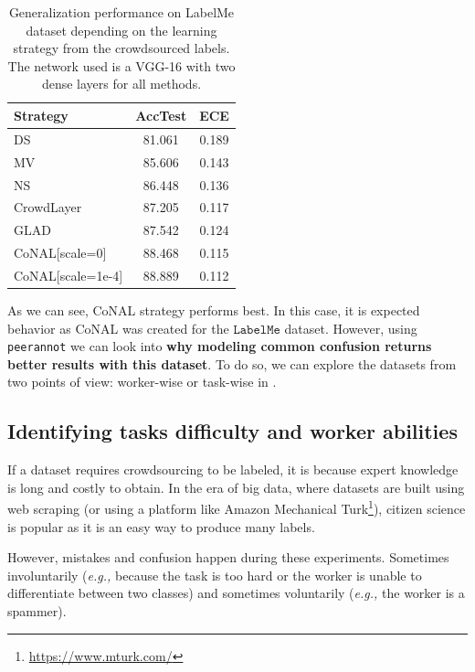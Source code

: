 \begin{table}[tbh]
    \centering
    \begin{tabular}{|l|c|c|}
    \hline
    \rowcolor{gray!20}
    \textbf{Strategy} & \textbf{AccTest} & \textbf{ECE} \\
    \hline
    DS & 81.061 & 0.189 \\
    MV & 85.606 & 0.143 \\
    NS & 86.448 & 0.136 \\
    CrowdLayer & 87.205 & 0.117 \\
    GLAD & 87.542 & 0.124 \\
    CoNAL[scale=0] & 88.468 & 0.115 \\
    \cellcolor{green!20}CoNAL[scale=1e-4] & \cellcolor{green!20}88.889 & \cellcolor{green!20}0.112 \\
    \hline
    \end{tabular}
    \caption{Generalization performance on LabelMe dataset depending on the learning strategy from the crowdsourced labels. The network used is a VGG-16 with two dense layers for all methods.}
    \label{tav:perf-labelme}
    \end{table}

As we can see, CoNAL strategy performs best.
In this case, it is expected behavior as CoNAL was created for the $\texttt{LabelMe}$ dataset.
However, using \texttt{peerannot} we can look into \textbf{why modeling common confusion returns better results with this dataset}.
To do so, we can explore the datasets from two points of view: worker-wise or task-wise in .

\subsection{Identifying tasks difficulty and worker abilities}
\label{subsec:exploration}

If a dataset requires crowdsourcing to be labeled, it is because expert knowledge is long and costly to obtain. In the era of big data, where datasets are built using web scraping (or using a platform like Amazon Mechanical Turk\footnote{\url{https://www.mturk.com/}}), citizen science is popular as it is an easy way to produce many labels.


However, mistakes and confusion happen during these experiments.
Sometimes involuntarily (\emph{e.g.,} because the task is too hard or the worker is unable to differentiate between two classes) and sometimes voluntarily (\emph{e.g.,} the worker is a spammer).

